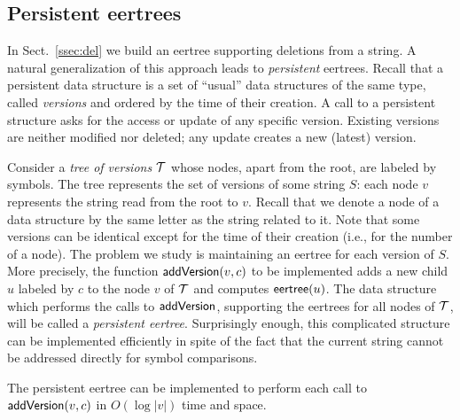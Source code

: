 \documentclass{llncs}
\def\eertree{{\sf eertree}}
\def\addv{{\sf addVersion}}
\def\cT{{\cal T}}
\begin{document}
\subsection{Persistent eertrees}

In Sect.~\ref{ssec:del} we build an eertree supporting deletions from a string. A natural generalization of this approach leads to \emph{persistent} eertrees. Recall that a persistent data structure is a set of ``usual'' data structures of the same type, called \emph{versions} and ordered by the time of their creation. A call to a persistent structure asks for the access or update of any specific version. Existing versions are neither modified nor deleted; any update creates a new (latest) version.
 
Consider a \emph{tree of versions} $\cT$ whose nodes, apart from the root, are labeled by symbols. The tree represents the set of versions of some string $S$: each node $v$ represents the string read from the root to $v$. Recall that we denote a node of a data structure by the same letter as the string related to it. Note that some versions can be identical except for the time of their creation (i.e., for the number of a node). The problem we study is maintaining an eertree for each version of $S$. More precisely, the function $\addv(v,c)$ to be implemented adds a new child $u$ labeled by $c$ to the node $v$ of $\cT$ and computes $\eertree(u)$. The data structure which performs the calls to $\addv$, supporting the eertrees for all nodes of $\cT$, will be called a \emph{persistent eertree}. Surprisingly enough, this complicated structure can be implemented efficiently in spite of the fact that the current string cannot be addressed directly for symbol comparisons.

\begin{proposition}
The persistent eertree can be implemented to perform each call to $\addv(v,c)$ in $O(\log|v|)$ time and space.
\end{proposition}
\end{document}
